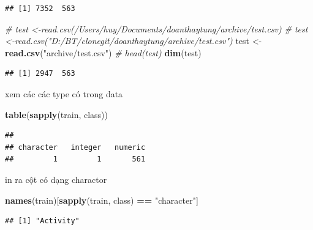 \documentclass[
]{article}
\newenvironment{Shaded}{\begin{snugshade}}{\end{snugshade}}
\newcommand{\CommentTok}[1]{\textcolor[rgb]{0.56,0.35,0.01}{\textit{#1}}}
\newcommand{\FunctionTok}[1]{\textcolor[rgb]{0.13,0.29,0.53}{\textbf{#1}}}
\newcommand{\NormalTok}[1]{#1}
\newcommand{\OtherTok}[1]{\textcolor[rgb]{0.56,0.35,0.01}{#1}}
\newcommand{\SpecialCharTok}[1]{\textcolor[rgb]{0.81,0.36,0.00}{\textbf{#1}}}
\newcommand{\StringTok}[1]{\textcolor[rgb]{0.31,0.60,0.02}{#1}}
\begin{document}
\begin{verbatim}
## [1] 7352  563
\end{verbatim}

\begin{Shaded}
\begin{Highlighting}[]
\CommentTok{\# test \textless{}{-}read.csv(\textquotesingle{}/Users/huy/Documents/doanthaytung/archive/test.csv\textquotesingle{})}
\CommentTok{\# test \textless{}{-}read.csv("D:/BT/clonegit/doanthaytung/archive/test.csv")}
\NormalTok{test }\OtherTok{\textless{}{-}} \FunctionTok{read.csv}\NormalTok{(}\StringTok{"archive/test.csv"}\NormalTok{)}
\CommentTok{\# head(test)}
\FunctionTok{dim}\NormalTok{(test)}
\end{Highlighting}
\end{Shaded}

\begin{verbatim}
## [1] 2947  563
\end{verbatim}

xem các các type có trong data

\begin{Shaded}
\begin{Highlighting}[]
\FunctionTok{table}\NormalTok{(}\FunctionTok{sapply}\NormalTok{(train, class))}
\end{Highlighting}
\end{Shaded}

\begin{verbatim}
## 
## character   integer   numeric 
##         1         1       561
\end{verbatim}

in ra cột có dạng charactor

\begin{Shaded}
\begin{Highlighting}[]
\FunctionTok{names}\NormalTok{(train)[}\FunctionTok{sapply}\NormalTok{(train, class) }\SpecialCharTok{==} \StringTok{"character"}\NormalTok{]}
\end{Highlighting}
\end{Shaded}

\begin{verbatim}
## [1] "Activity"
\end{verbatim}

\begin{Shaded}
\end{Shaded}
\end{document}
